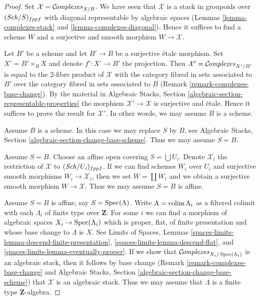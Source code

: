 \begin{proof}
Set $\mathcal{X} = \mathcal{C}\!\mathit{omplexes}_{X/B}$. We have seen that $\mathcal{X}$
is a stack in groupoids over $(\mathit{Sch}/S)_{fppf}$ with diagonal representable
by algebraic spaces
(Lemmas \ref{lemma-complexes-stack} and \ref{lemma-complexes-diagonal}).
Hence it suffices to find a scheme $W$ and a surjective and smooth
morphism $W \to \mathcal{X}$.

\medskip\noindent
Let $B'$ be a scheme and let $B' \to B$ be a surjective \'etale morphism.
Set $X' = B' \times_B X$ and denote $f' : X' \to B'$ the projection.
Then $\mathcal{X}' = \mathcal{C}\!\mathit{omplexes}_{X'/B'}$ is equal to the $2$-fibre
product of $\mathcal{X}$ with the category fibred in sets
associated to $B'$ over the category fibred in sets associated to $B$
(Remark \ref{remark-complexes-base-change}). By the material in
Algebraic Stacks, Section \ref{algebraic-section-representable-properties}
the morphism $\mathcal{X}' \to \mathcal{X}$ is surjective and \'etale.
Hence it suffices to prove the result for $\mathcal{X}'$.
In other words, we may assume $B$ is a scheme.

\medskip\noindent
Assume $B$ is a scheme. In this case we may replace $S$ by $B$, see
Algebraic Stacks, Section \ref{algebraic-section-change-base-scheme}.
Thus we may assume $S = B$.

\medskip\noindent
Assume $S = B$. Choose an affine open covering $S = \bigcup U_i$.
Denote $\mathcal{X}_i$ the restriction of $\mathcal{X}$ to
$(\mathit{Sch}/U_i)_{fppf}$. If we can find schemes $W_i$ over $U_i$ and
surjective smooth morphisms $W_i \to \mathcal{X}_i$, then we
set $W = \coprod W_i$ and we obtain a surjective smooth morphism
$W \to \mathcal{X}$. Thus we may assume $S = B$ is affine.

\medskip\noindent
Assume $S = B$ is affine, say $S = \mathop{\mathrm{Spec}}(\Lambda)$.
Write $\Lambda = \mathop{\mathrm{colim}}\nolimits \Lambda_i$ as a filtered colimit with each $\Lambda_i$
of finite type over $\mathbf{Z}$. For some $i$ we can find
a morphism of algebraic spaces $X_i \to \mathop{\mathrm{Spec}}(\Lambda_i)$
which is proper, flat, of finite presentation and whose base change
to $\Lambda$ is $X$. See Limits of Spaces, Lemmas
\ref{spaces-limits-lemma-descend-finite-presentation},
\ref{spaces-limits-lemma-descend-flat}, and
\ref{spaces-limits-lemma-eventually-proper}.
If we show that $\mathcal{C}\!\mathit{omplexes}_{X_i/\mathop{\mathrm{Spec}}(\Lambda_i)}$ is an
algebraic stack, then it follows by base change
(Remark \ref{remark-complexes-base-change} and
Algebraic Stacks, Section \ref{algebraic-section-change-base-scheme})
that $\mathcal{X}$ is an algebraic stack.
Thus we may assume that $\Lambda$ is a finite type $\mathbf{Z}$-algebra.


\end{proof}
